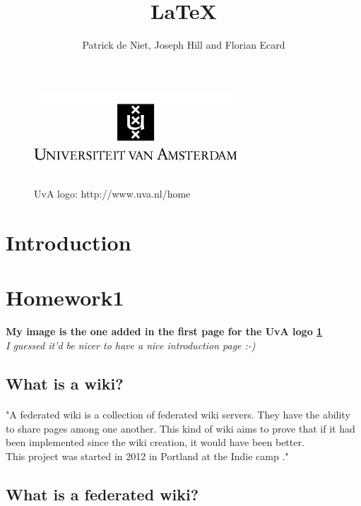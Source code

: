 \documentclass[10pt,a4paper]{article}
\author{Patrick de Niet, Joseph Hill and Florian Ecard}
\title{\LaTeX}
\begin{document}
    
\begin{figure}[t]
\centering
\includegraphics[width=7.6cm]{uva.jpg}\\
\caption{UvA logo: http://www.uva.nl/home}
\label{UvA}
\end{figure}
\maketitle


\newpage
\section{Introduction}
\paragraph{}


\newpage
\tableofcontents


\newpage
\section{Homework1}
\textbf{My image is the one added in the first page for the UvA logo \ref{UvA}}\\
\textit{I guessed it'd be nicer to have a nice introduction page :-)}

\subsection{What is a wiki?}

\paragraph{}"A federated wiki is a collection of federated wiki servers. They have the ability to share pages among one another. This kind of wiki aims to prove that if it had been implemented since the wiki creation, it would have been better.\\
This project was started in 2012 in Portland at the Indie camp \cite{floref2}."\cite{floref1}

\subsection{What is a federated wiki?}
\end{document}
